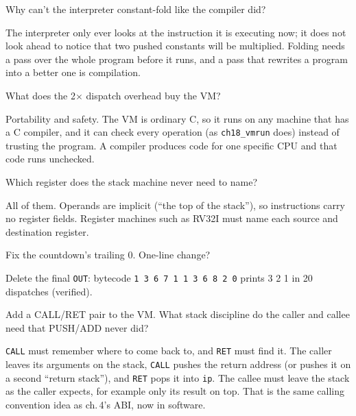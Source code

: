 \begin{exercise}[easy]
Why can't the interpreter constant-fold like the compiler did?
\end{exercise}
\begin{solution}
The interpreter only ever looks at the instruction it is executing now;
it does not look ahead to notice that two pushed constants will be
multiplied. Folding needs a pass over the whole program before it runs, and a
pass that rewrites a program into a better one is compilation.
\end{solution}
\begin{exercise}[easy]
What does the 2$\times$ dispatch overhead buy the VM?
\end{exercise}
\begin{solution}
Portability and safety. The VM is ordinary C, so it runs on any machine that
has a C compiler, and it can check every operation (as \texttt{ch18\_vmrun}
does) instead of trusting the program. A compiler produces code for
one specific CPU and that code runs unchecked.
\end{solution}
\begin{exercise}[easy]
Which register does the stack machine never need to name?
\end{exercise}
\begin{solution}
All of them. Operands are implicit (``the top of the stack''), so
instructions carry no register fields. Register machines such as RV32I
must name each source and destination register.
\end{solution}
\begin{exercise}[easy]
Fix the countdown's trailing 0. One-line change?
\end{exercise}
\begin{solution}
Delete the final \texttt{OUT}: bytecode \texttt{1 3 6 7 1 1 3 6 8 2 0}
prints 3 2 1 in 20 dispatches (verified).
\end{solution}
\begin{exercise}[medium]
Add a CALL/RET pair to the VM. What stack discipline do the
caller and callee need that PUSH/ADD never did?
\end{exercise}
\begin{solution}
\texttt{CALL} must remember where to come back to, and \texttt{RET} must
find it. The caller leaves its arguments on the stack, \texttt{CALL} pushes
the return address (or pushes it on a second ``return stack''), and \texttt{RET}
pops it into \texttt{ip}. The callee must leave the stack as the caller
expects, for example only its result on top. That is the same
calling convention idea as ch.\,4's ABI, now in software.
\end{solution}
